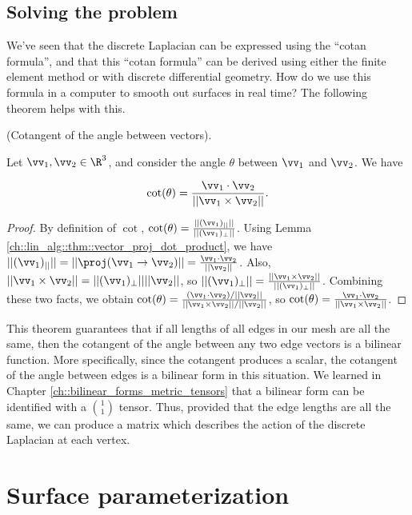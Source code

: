 \subsection*{Solving the problem}

We've seen that the discrete Laplacian can be expressed using the ``cotan formula'', and that this ``cotan formula'' can be derived using either the finite element method or with discrete differential geometry. How do we use this formula in a computer to smooth out surfaces in real time? The following theorem helps with this.

\begin{theorem}
    (Cotangent of the angle between vectors).
    
    Let $\vv_1, \vv_2 \in \R^3$, and consider the angle $\theta$ between $\vv_1$ and $\vv_2$. We have
    
    \begin{align*}
        \cot(\theta) = \frac{\vv_1 \cdot \vv_2}{||\vv_1 \times \vv_2||}.
    \end{align*}
\end{theorem}

\begin{proof}
    By definition of $\cot$, $\cot(\theta) = \frac{||(\vv_1)_{||}||}{||(\vv_1)_\perp||}$. Using Lemma \ref{ch::lin_alg::thm::vector_proj_dot_product}, we have $||(\vv_1)_{||}|| = ||\proj(\vv_1 \rightarrow \vv_2)|| = \frac{\vv_1 \cdot \vv_2}{||\vv_2||}$. Also, $||\vv_1 \times \vv_2|| = ||(\vv_1)_\perp|| ||\vv_2||$, so $||(\vv_1)_\perp|| = \frac{||\vv_1 \times \vv_2||}{||(\vv_1)_\perp||}$. Combining these two facts, we obtain $\cot(\theta) = \frac{(\vv_1 \cdot \vv_2)/||\vv_2||}{||\vv_1 \times \vv_2||/||\vv_2||}$, so $\cot(\theta) = \frac{\vv_1 \cdot \vv_2}{||\vv_1 \times \vv_2||}$.
\end{proof}

This theorem guarantees that if all lengths of all edges in our mesh are all the same, then the cotangent of the angle between any two edge vectors is a bilinear function. More specifically, since the cotangent produces a scalar, the cotangent of the angle between edges is a bilinear form in this situation. We learned in Chapter \ref{ch::bilinear_forms_metric_tensors} that a bilinear form can be identified with a $\binom{1}{1}$ tensor. Thus, provided that the edge lengths are all the same, we can produce a matrix which describes the action of the discrete Laplacian at each vertex.

\newpage

\section{Surface parameterization}

